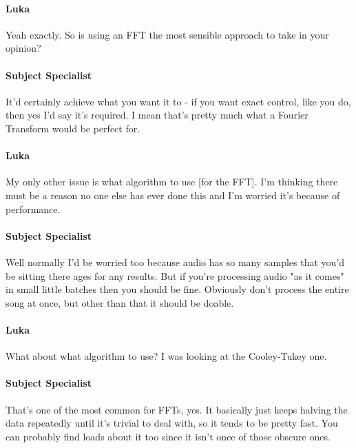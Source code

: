 {{\begin{minipage}{15cm}
			\vspace{12pt}
			
			\paragraph{Luka} Yeah exactly. So is using an FFT the most sensible approach to take in your opinion?
			
			\vspace{12pt}
			
			\paragraph{Subject Specialist} It'd certainly achieve what you want it to - if you want exact control, like you do, then yes I'd say it's required. I mean that's pretty much what a Fourier Transform would be perfect for.
			
			\vspace{12pt}
			
			\paragraph{Luka} My only other issue is what algorithm to use [for the FFT]. I'm thinking there must be a reason no one else has ever done this and I'm worried it's because of performance.
			
			\vspace{12pt}
			
			\paragraph{Subject Specialist} Well normally I'd be worried too because audio has so many samples that you'd be sitting there ages for any results. But if you're processing audio "as it comes" in small little batches then you should be fine. Obviously don't process the entire song at once, but other than that it should be doable.
			
			\vspace{12pt}
			
			\paragraph{Luka} What about what algorithm to use? I was looking at the Cooley-Tukey one.
			
			\vspace{12pt}
			
			\paragraph{Subject Specialist} That's one of the most common for FFTs, yes. It basically just keeps halving the data repeatedly until it's trivial to deal with, so it tends to be pretty fast. You can probably find loads about it too since it isn't once of those obscure ones.
			

\end{minipage}}}
